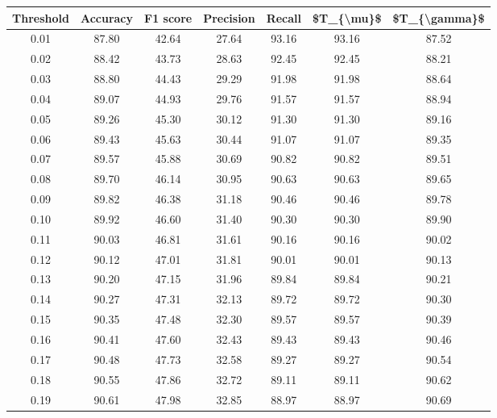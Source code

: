 \begin{tabular}{|c|c|c|c|c|c|c|}
\hline
 Threshold &  Accuracy &  F1 score &  Precision &  Recall &  \$T\_\{\textbackslash mu\}\$ &  \$T\_\{\textbackslash gamma\}\$ \\
\hline
      0.01 &     87.80 &     42.64 &      27.64 &   93.16 &      93.16 &         87.52 \\
      0.02 &     88.42 &     43.73 &      28.63 &   92.45 &      92.45 &         88.21 \\
      0.03 &     88.80 &     44.43 &      29.29 &   91.98 &      91.98 &         88.64 \\
      0.04 &     89.07 &     44.93 &      29.76 &   91.57 &      91.57 &         88.94 \\
      0.05 &     89.26 &     45.30 &      30.12 &   91.30 &      91.30 &         89.16 \\
      0.06 &     89.43 &     45.63 &      30.44 &   91.07 &      91.07 &         89.35 \\
      0.07 &     89.57 &     45.88 &      30.69 &   90.82 &      90.82 &         89.51 \\
      0.08 &     89.70 &     46.14 &      30.95 &   90.63 &      90.63 &         89.65 \\
      0.09 &     89.82 &     46.38 &      31.18 &   90.46 &      90.46 &         89.78 \\
      0.10 &     89.92 &     46.60 &      31.40 &   90.30 &      90.30 &         89.90 \\
      0.11 &     90.03 &     46.81 &      31.61 &   90.16 &      90.16 &         90.02 \\
      0.12 &     90.12 &     47.01 &      31.81 &   90.01 &      90.01 &         90.13 \\
      0.13 &     90.20 &     47.15 &      31.96 &   89.84 &      89.84 &         90.21 \\
      0.14 &     90.27 &     47.31 &      32.13 &   89.72 &      89.72 &         90.30 \\
      0.15 &     90.35 &     47.48 &      32.30 &   89.57 &      89.57 &         90.39 \\
      0.16 &     90.41 &     47.60 &      32.43 &   89.43 &      89.43 &         90.46 \\
      0.17 &     90.48 &     47.73 &      32.58 &   89.27 &      89.27 &         90.54 \\
      0.18 &     90.55 &     47.86 &      32.72 &   89.11 &      89.11 &         90.62 \\
      0.19 &     90.61 &     47.98 &      32.85 &   88.97 &      88.97 &         90.69 \\

\end{tabular}
